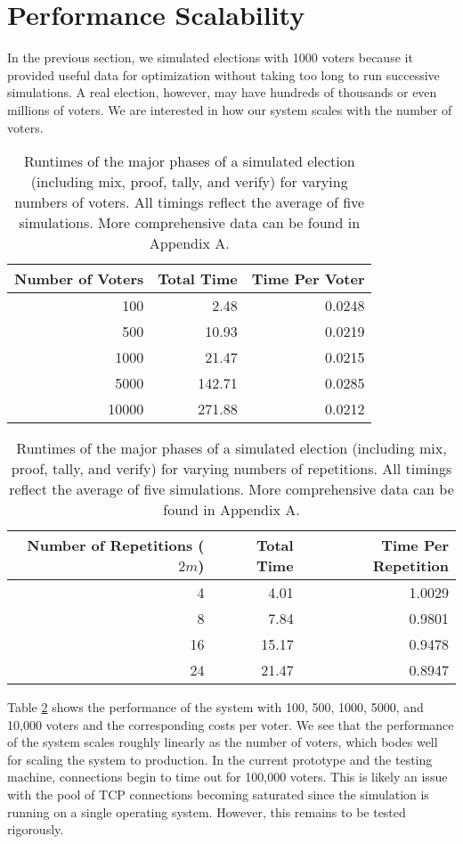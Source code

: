 \section{Performance Scalability} \label{perf:scale}

In the previous section, we simulated elections with 1000 voters because it provided useful data for optimization without taking too long to run successive simulations. A real election, however, may have hundreds of thousands or even millions of voters. We are interested in how our system scales with the number of voters.

\begin{table}[htbp]
\centering
\begin{tabular}{r | r | r}
  \textbf{Number of Voters} & \textbf{Total Time} & \textbf{Time Per Voter} \\
  \hline
  100 & 2.48 & 0.0248 \\
  500 & 10.93 & 0.0219 \\
  1000 & 21.47 & 0.0215 \\
  5000 & 142.71 & 0.0285 \\
  10000 & 271.88 & 0.0212
\end{tabular}
\caption[Election runtime for varying numbers of voters]{Runtimes of the major phases of a simulated election (including mix, proof, tally, and verify) for varying numbers of voters. All timings reflect the average of five simulations. More comprehensive data can be found in Appendix A.}
\label{perf:nvoters}
\end{table}

\begin{table}[htbp]
\centering
\begin{tabular}{r | r | r}
  \textbf{Number of Repetitions ($2m$)} & \textbf{Total Time} & \textbf{Time Per Repetition} \\
  \hline
  4 & 4.01 & 1.0029 \\
  8 & 7.84 & 0.9801 \\
  16 & 15.17 & 0.9478 \\
  24 & 21.47 & 0.8947
\end{tabular}
\caption[Election runtime for varying numbers of repetitions]{Runtimes of the major phases of a simulated election (including mix, proof, tally, and verify) for varying numbers of repetitions. All timings reflect the average of five simulations. More comprehensive data can be found in Appendix A.}
\label{perf:nvoters}
\end{table}

Table \ref{perf:nvoters} shows the performance of the system with 100, 500, 1000, 5000, and 10,000 voters and the corresponding costs per voter. We see that the performance of the system scales roughly linearly as the number of voters, which bodes well for scaling the system to production. In the current prototype and the testing machine, connections begin to time out for 100,000 voters. This is likely an issue with the pool of TCP connections becoming saturated since the simulation is running on a single operating system. However, this remains to be tested rigorously.

